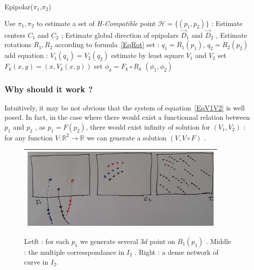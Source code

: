 \documentclass{ipol}
\newcommand{\RR}{\ensuremath{\mathbb{R}}}
\begin{document}
\begin{algorithm}
\caption{Epipolar($\pi_1$,$\pi_2$)}
\begin{algorithmic}
    \STATE Use $\pi_1,\pi_2$ to estimate a set of \emph{H-Compatible} point $\mathcal{H} =\{(p_1,p_2)\}$ : 
    \STATE Estimate centers $C_1$ and $C_2$ ;
    \STATE Estimate global direction of epipolars $\vec{D}_1$ and $\vec{D}_2$ ,
    \STATE Estimate rotations $R_1,R_2$ according to formula~\ref{EqRot}
              \STATE set : $q_1 = R_1(p_1)$,  $q_2 = R_2(p_2)$
              \STATE add equation : $V_1(q_1) = V_2(q_2)$
    \ENDFOR
    \STATE estimate by least square $V_1$ and $V_2$
    \STATE set $F_k(x,y)=(x,V_k(x,y))$  %
    \STATE set $\phi_k =  F_k \circ  R_k $ %
    \RETURN $(\phi_1,\phi_2)$
\end{algorithmic}
\label{AlgoGlob}
\end{algorithm}



\subsubsection{Why should it work ?}
\label{WhyWork}

Intuitively, it may be not obvious that the system of equation~\ref{EqV1V2} is well posed.
In fact, in the case where there would exist a functionnal relation between
$p_1$ and $p_2$ , as $p_1=F(p_2)$,  there would exist infinity of solution
for $(V_1,V_2)$ :   for any function $V: \RR^2 \rightarrow \RR $ we can generate a solution $(V,V\circ F)$ .

\begin{figure}
\centering
\begin{tabular}{||c||}
 \hline \hline
\includegraphics[width=10cm]{FIGS/NonFuncCorresp.jpg}
 \\ \hline \hline
\end{tabular}
\caption{Letft : for each $p_1$ we generate several $3d$ point on $B_1(p_1)$ . Middle :
         the multiple corresspondance in $I_2$ . Right : a dense network of curve in $I_2$.}
 
\label{NonFuncCorresp}
\end{figure}
\end{document}
